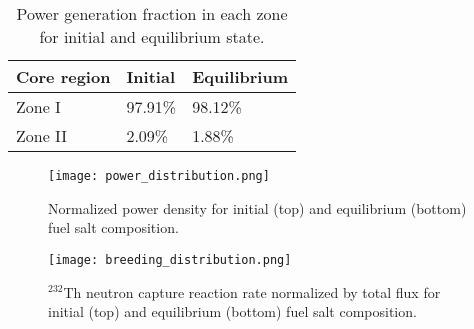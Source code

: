 \begin{table}[ht!]
  \centering
  \caption{Power generation fraction in each zone for initial and equilibrium state.}
\begin{tabular}{| m{} | m{} | m{} |} \hline
Core region      & Initial      & Equilibrium   \\ [3pt]\hline   
Zone I           & 97.91\%      & 98.12\%   \\ [3pt] \hline
Zone II          & 2.09\%       & 1.88\%   \\ [3pt] \hline
\end{tabular}
  \label{tab:powgen_fraction}
\end{table}

\begin{figure}[htp!] %
  \centering
    \vspace{-0.3em}
  \texttt{[image: power\_distribution.png]} 
  \caption{Normalized power density for initial (top) and equilibrium (bottom) fuel salt composition.}
    \vspace{-0.6em}
  \label{fig:pow_den}
\end{figure}
\FloatBarrier

\begin{figure}[htp!] %
  \centering
    \vspace{-0.3em}
  \texttt{[image: breeding\_distribution.png]} 
  \caption{$^{232}$Th neutron capture reaction rate normalized by total flux for initial (top) and equilibrium (bottom) fuel salt composition.}
    \vspace{-0.6em}
  \label{fig:breeding_den}
\end{figure}
\FloatBarrier

